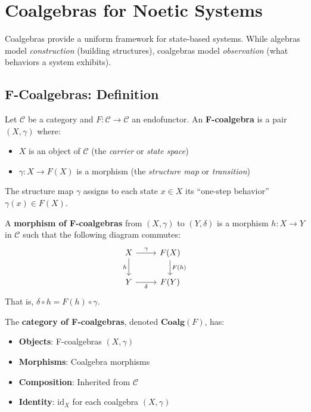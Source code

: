 \section{Coalgebras for Noetic Systems}
\label{sec:coalgebras-noetic}

Coalgebras provide a uniform framework for state-based systems. While algebras
model \emph{construction} (building structures), coalgebras model \emph{observation}
(what behaviors a system exhibits).

\subsection{F-Coalgebras: Definition}
\label{subsec:f-coalgebras-def}

\begin{definition}[F-Coalgebra]
\label{def:f-coalgebra}
Let $\mathcal{C}$ be a category and $F : \mathcal{C} \to \mathcal{C}$ an endofunctor.
An \textbf{F-coalgebra} is a pair $(X, \gamma)$ where:
\begin{itemize}
  \item $X$ is an object of $\mathcal{C}$ (the \emph{carrier} or \emph{state space})
  \item $\gamma : X \to F(X)$ is a morphism (the \emph{structure map} or \emph{transition})
\end{itemize}
The structure map $\gamma$ assigns to each state $x \in X$ its ``one-step behavior''
$\gamma(x) \in F(X)$.
\end{definition}

\begin{definition}
\label{def:coalgebra-morphism}
A \textbf{morphism of F-coalgebras} from $(X, \gamma)$ to $(Y, \delta)$ is a
morphism $h : X \to Y$ in $\mathcal{C}$ such that the following diagram commutes:
\[
\begin{tikzcd}
  X \arrow[r, "\gamma"] \arrow[d, "h"']
  & F(X) \arrow[d, "F(h)"] \\
  Y \arrow[r, "\delta"']
  & F(Y)
\end{tikzcd}
\]
That is, $\delta \circ h = F(h) \circ \gamma$.
\end{definition}

\begin{definition}
\label{def:coalg-category}
The \textbf{category of F-coalgebras}, denoted $\mathbf{Coalg}(F)$, has:
\begin{itemize}
  \item \textbf{Objects}: F-coalgebras $(X, \gamma)$
  \item \textbf{Morphisms}: Coalgebra morphisms
  \item \textbf{Composition}: Inherited from $\mathcal{C}$
  \item \textbf{Identity}: $\mathrm{id}_X$ for each coalgebra $(X, \gamma)$
\end{itemize}
\end{definition}

